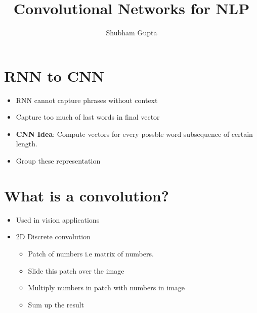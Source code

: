 \documentclass[a4paper]{article}
\title{Convolutional Networks for NLP}
\author{Shubham Gupta}
\begin{document}
\maketitle
\section{RNN to CNN}
\begin{itemize}
    \item RNN cannot capture phrases without context
    \item Capture too much of last words in final vector
    \item \textbf{CNN Idea}: Compute vectors for every possble word subsequence of certain length.  
    \item Group these representation
\end{itemize}
\section{What is a convolution?}
\begin{itemize}
    \item Used in vision applications
    \item 2D Discrete convolution
        \begin{itemize}
            \item Patch of numbers i.e matrix of numbers.
            \item Slide this patch over the image
            \item Multiply numbers in patch with numbers in image
            \item Sum up the result
        \end{itemize}
\end{itemize}
\end{document}

